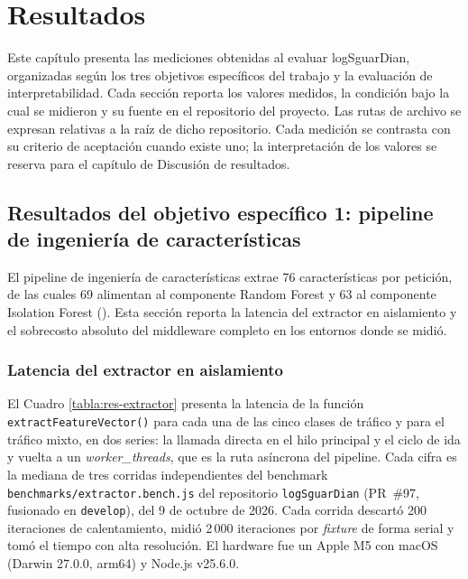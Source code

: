 \chapter{Resultados}

Este capítulo presenta las mediciones obtenidas al evaluar logSguarDian, organizadas según los tres objetivos específicos del trabajo y la evaluación de interpretabilidad. Cada sección reporta los valores medidos, la condición bajo la cual se midieron y su fuente en el repositorio del proyecto. Las rutas de archivo se expresan relativas a la raíz de dicho repositorio. Cada medición se contrasta con su criterio de aceptación cuando existe uno; la interpretación de los valores se reserva para el capítulo de Discusión de resultados.

\section{Resultados del objetivo específico 1: pipeline de ingeniería de características}

El pipeline de ingeniería de características extrae 76 características por petición, de las cuales 69 alimentan al componente Random Forest y 63 al componente Isolation Forest (). Esta sección reporta la latencia del extractor en aislamiento y el sobrecosto absoluto del middleware completo en los entornos donde se midió.

\subsection{Latencia del extractor en aislamiento}

El Cuadro \ref{tabla:res-extractor} presenta la latencia de la función \texttt{extractFeatureVector()} para cada una de las cinco clases de tráfico y para el tráfico mixto, en dos series: la llamada directa en el hilo principal y el ciclo de ida y vuelta a un \textit{worker\_threads}, que es la ruta asíncrona del pipeline. Cada cifra es la mediana de tres corridas independientes del benchmark \texttt{benchmarks/extractor.bench.js} del repositorio \texttt{logSguarDian} (PR~\#97, fusionado en \texttt{develop}), del 9 de octubre de 2026. Cada corrida descartó 200 iteraciones de calentamiento, midió 2\,000 iteraciones por \textit{fixture} de forma serial y tomó el tiempo con alta resolución. El hardware fue un Apple M5 con macOS (Darwin 27.0.0, arm64) y Node.js v25.6.0.

